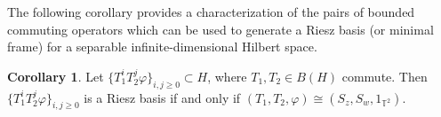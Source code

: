 \documentclass[12pt,reqno]{amsart}
\theoremstyle{definition}
\theoremstyle{definition}
\newtheorem{corollary}[theorem]{Corollary}
\numberwithin{equation}{section}
\begin{document}


The following corollary provides a characterization of the pairs of bounded commuting operators which can be
used to generate a Riesz basis (or minimal frame) for a separable infinite-dimensional Hilbert space.
\begin{corollary}
Let $\{T_1^iT_2^j\varphi\}_{i,j \geq 0} \subset H$, where $T_1, T_2  \in B(H)$ commute. Then $\{T_1^iT_2^j\varphi\}_{i,j \geq 0}$ is a Riesz basis if and only if $(T_1, T_2, \varphi)\cong (S_z, S_w, {1}_{\mathbb{T}^2})$. 
\end{corollary}
\end{document}
